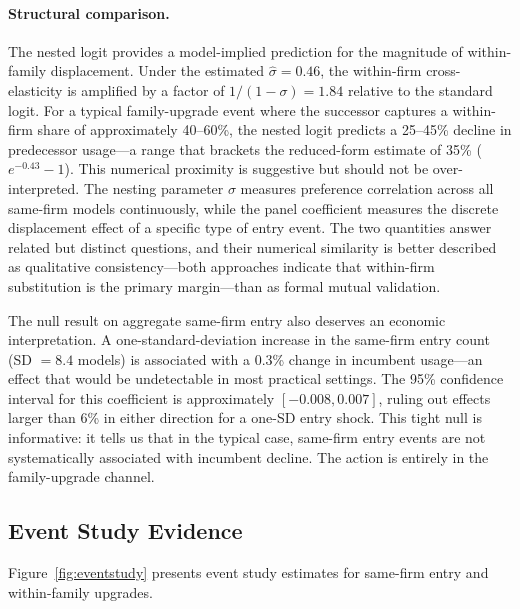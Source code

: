 \documentclass[11pt, a4paper]{article}
\begin{document}
\paragraph{Structural comparison.} The nested logit provides a model-implied prediction for the magnitude of within-family displacement. Under the estimated $\hat{\sigma} = 0.46$, the within-firm cross-elasticity is amplified by a factor of $1/(1-\sigma) = 1.84$ relative to the standard logit. For a typical family-upgrade event where the successor captures a within-firm share of approximately 40--60\%, the nested logit predicts a 25--45\% decline in predecessor usage---a range that brackets the reduced-form estimate of 35\% ($e^{-0.43} - 1$). This numerical proximity is suggestive but should not be over-interpreted. The nesting parameter $\sigma$ measures preference correlation across all same-firm models continuously, while the panel coefficient measures the discrete displacement effect of a specific type of entry event. The two quantities answer related but distinct questions, and their numerical similarity is better described as qualitative consistency---both approaches indicate that within-firm substitution is the primary margin---than as formal mutual validation.

The null result on aggregate same-firm entry also deserves an economic interpretation. A one-standard-deviation increase in the same-firm entry count (SD $= 8.4$ models) is associated with a 0.3\% change in incumbent usage---an effect that would be undetectable in most practical settings. The 95\% confidence interval for this coefficient is approximately $[-0.008, 0.007]$, ruling out effects larger than 6\% in either direction for a one-SD entry shock. This tight null is informative: it tells us that in the typical case, same-firm entry events are not systematically associated with incumbent decline. The action is entirely in the family-upgrade channel.

\subsection{Event Study Evidence}

Figure~\ref{fig:eventstudy} presents event study estimates for same-firm entry and within-family upgrades.
\end{document}
